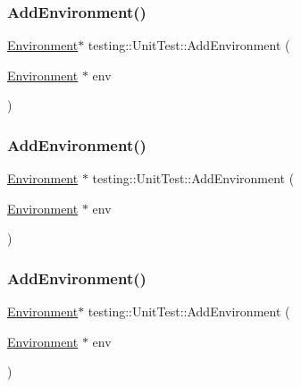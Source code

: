 \mbox{\label{classtesting_1_1_unit_test_a3b64e1255cbd346e0ce40cd3e7a514f7}} 
\subsubsection{\texorpdfstring{AddEnvironment()}{AddEnvironment()}\hspace{0.1cm}{\footnotesize\ttfamily [1/3]}}
{\footnotesize\ttfamily \mbox{\hyperlink{classtesting_1_1_environment}{Environment}}$\ast$ testing\+::\+Unit\+Test\+::\+Add\+Environment (\begin{DoxyParamCaption}\item[{\mbox{\hyperlink{classtesting_1_1_environment}{Environment}} $\ast$}]{env }\end{DoxyParamCaption})\hspace{0.3cm}{\ttfamily [private]}}

\mbox{\label{classtesting_1_1_unit_test_a1eb8e999b8696889bf1c64b4f0161203}} 
\subsubsection{\texorpdfstring{AddEnvironment()}{AddEnvironment()}\hspace{0.1cm}{\footnotesize\ttfamily [2/3]}}
{\footnotesize\ttfamily \mbox{\hyperlink{classtesting_1_1_environment}{Environment}} $\ast$ testing\+::\+Unit\+Test\+::\+Add\+Environment (\begin{DoxyParamCaption}\item[{\mbox{\hyperlink{classtesting_1_1_environment}{Environment}} $\ast$}]{env }\end{DoxyParamCaption})\hspace{0.3cm}{\ttfamily [private]}}

\mbox{\label{classtesting_1_1_unit_test_a3b64e1255cbd346e0ce40cd3e7a514f7}} 
\subsubsection{\texorpdfstring{AddEnvironment()}{AddEnvironment()}\hspace{0.1cm}{\footnotesize\ttfamily [3/3]}}
{\footnotesize\ttfamily \mbox{\hyperlink{classtesting_1_1_environment}{Environment}}$\ast$ testing\+::\+Unit\+Test\+::\+Add\+Environment (\begin{DoxyParamCaption}\item[{\mbox{\hyperlink{classtesting_1_1_environment}{Environment}} $\ast$}]{env }\end{DoxyParamCaption})\hspace{0.3cm}{\ttfamily [private]}}

